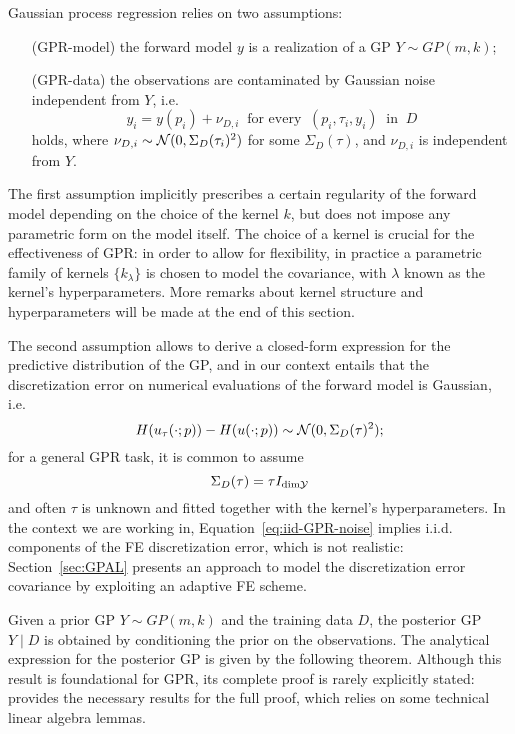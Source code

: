 Gaussian process regression relies on two assumptions:
\begin{itemize}[font=\itshape, leftmargin=1.5cm, align=right, labelwidth=2.4cm]
    \item[(GPR-model)] the forward model $y$ is a realization of a GP $Y \sim GP(m, k)$;
    \item[(GPR-data)] the observations are contaminated by Gaussian noise independent from $Y$, i.e. 
    \[ 
        y_i = y(p_i) + \nu_{D,i} \ \text{ for every } \ (p_i,\tau_i,y_i) \ \text{ in } \ D 
    \] 
    holds, where $\nu_{D,i} \sim \mathcal N(0, \Sigma_D(\tau_i)^2)$ for some $\Sigma_D(\tau)$, and $\nu_{D,i}$ is independent from $Y$.
\end{itemize}  
The first assumption implicitly prescribes a certain regularity of the forward model depending on the choice of the kernel $k$, but does not impose any parametric form on the model itself. 
The choice of a kernel is crucial for the effectiveness of GPR: in order to allow for flexibility, in practice a parametric family of kernels $\{ k_\lambda\}$ is chosen to model the covariance, with $\lambda$ known as the kernel's hyperparameters. More remarks about kernel structure and hyperparameters will be made at the end of this section.

The second assumption allows to derive a closed-form expression for the predictive distribution of the GP, and in our context entails that the discretization error on numerical evaluations of the forward model is Gaussian, i.e. 
\[
    H(u_{\tau}(\cdot; p)) - H(u(\cdot; p)) \sim \mathcal N(0, \Sigma_D(\tau)^2);
\] for a general GPR task, it is common to assume 
\begin{equation}\label{eq:iid-GPR-noise}
    \Sigma_D(\tau) = \tau I_{\text{dim} \mathcal Y}
\end{equation} 
and often $\tau$ is unknown and fitted together with the kernel's hyperparameters. \newline
In the context we are working in, Equation~\eqref{eq:iid-GPR-noise} implies i.i.d. components of the FE discretization error, which is not realistic: Section~\ref{sec:GPAL} presents an approach to model the discretization error covariance by exploiting an adaptive FE scheme. \medbreak

Given a prior GP $Y \sim GP(m, k)$ and the training data $D$, the posterior GP $Y \mid D$ is obtained by conditioning the prior on the observations. 
The analytical expression for the posterior GP is given by the following theorem.
Although this result is foundational for GPR, its complete proof is rarely explicitly stated:~\cite[Appendix A]{RasmussenWilliams2006} provides the necessary results for the full proof, which relies on some technical linear algebra lemmas.

